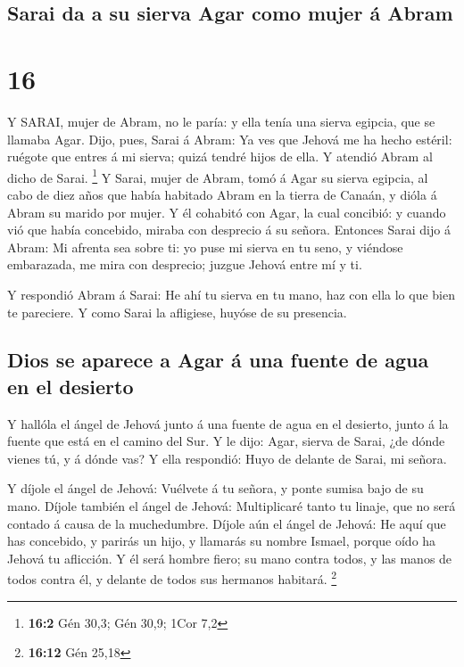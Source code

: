 \hypertarget{sarai-da-a-su-sierva-agar-como-mujer-uxe1-abram}{%
\subsection{Sarai da a su sierva Agar como mujer á
Abram}\label{sarai-da-a-su-sierva-agar-como-mujer-uxe1-abram}}

\hypertarget{section-15}{%
\section{16}\label{section-15}}

 Y SARAI, mujer de Abram, no le paría: y ella tenía una
sierva egipcia, que se llamaba Agar.  Dijo, pues, Sarai á
Abram: Ya ves que Jehová me ha hecho estéril: ruégote que entres á mi
sierva; quizá tendré hijos de ella. Y atendió Abram al dicho de Sarai.
\footnote{\textbf{16:2} Gén 30,3; Gén 30,9; 1Cor 7,2}  Y
Sarai, mujer de Abram, tomó á Agar su sierva egipcia, al cabo de diez
años que había habitado Abram en la tierra de Canaán, y dióla á Abram su
marido por mujer.  Y él cohabitó con Agar, la cual concibió:
y cuando vió que había concebido, miraba con desprecio á su señora.
 Entonces Sarai dijo á Abram: Mi afrenta sea sobre ti: yo
puse mi sierva en tu seno, y viéndose embarazada, me mira con desprecio;
juzgue Jehová entre mí y ti.

 Y respondió Abram á Sarai: He ahí tu sierva en tu mano, haz
con ella lo que bien te pareciere. Y como Sarai la afligiese, huyóse de
su presencia.

\hypertarget{dios-se-aparece-a-agar-uxe1-una-fuente-de-agua-en-el-desierto}{%
\subsection{Dios se aparece a Agar á una fuente de agua en el
desierto}\label{dios-se-aparece-a-agar-uxe1-una-fuente-de-agua-en-el-desierto}}

 Y hallóla el ángel de Jehová junto á una fuente de agua en
el desierto, junto á la fuente que está en el camino del Sur.
 Y le dijo: Agar, sierva de Sarai, ¿de dónde vienes tú, y á
dónde vas? Y ella respondió: Huyo de delante de Sarai, mi señora.

 Y díjole el ángel de Jehová: Vuélvete á tu señora, y ponte
sumisa bajo de su mano.  Díjole también el ángel de Jehová:
Multiplicaré tanto tu linaje, que no será contado á causa de la
muchedumbre.  Díjole aún el ángel de Jehová: He aquí que
has concebido, y parirás un hijo, y llamarás su nombre Ismael, porque
oído ha Jehová tu aflicción.  Y él será hombre fiero; su
mano contra todos, y las manos de todos contra él, y delante de todos
sus hermanos habitará. \footnote{\textbf{16:12} Gén 25,18}

